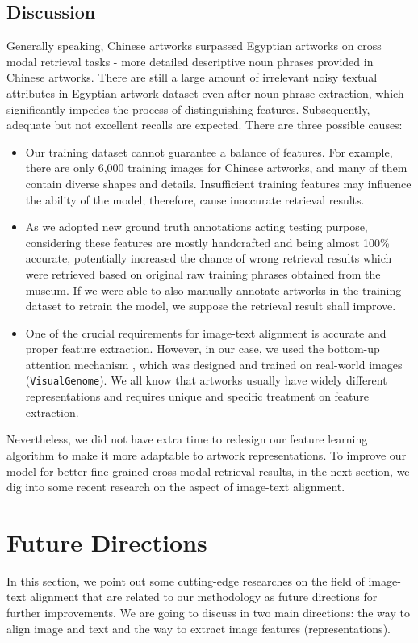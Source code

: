 \subsection{Discussion}
Generally speaking, Chinese artworks surpassed Egyptian artworks on cross modal retrieval tasks - more detailed descriptive noun phrases provided in Chinese artworks. There are still a large amount of irrelevant noisy textual attributes in Egyptian artwork dataset even after noun phrase extraction, which significantly impedes the process of distinguishing features. Subsequently, adequate but not excellent recalls are expected. There are three possible causes:

\begin{itemize}
    \item Our training dataset cannot guarantee a balance of features. For example, there are only 6,000 training images for Chinese artworks, and many of them contain diverse shapes and details. Insufficient training features may influence the ability of the model; therefore, cause inaccurate retrieval results.
    \item As we adopted new ground truth annotations acting testing purpose, considering these features are mostly handcrafted and being almost 100\% accurate, potentially increased the chance of wrong retrieval results which were retrieved based on original raw training phrases obtained from the museum. If we were able to also manually annotate artworks in the training dataset to retrain the model, we suppose the retrieval result shall improve.
    \item One of the crucial requirements for image-text alignment is accurate and proper feature extraction. However, in our case, we used the bottom-up attention mechanism \cite{bottomup}, which was designed and trained on real-world images (\verb|VisualGenome|). We all know that artworks usually have widely different representations and requires unique and specific treatment on feature extraction.
\end{itemize}

Nevertheless, we did not have extra time to redesign our feature learning algorithm to make it more adaptable to artwork representations. To improve our model for better fine-grained cross modal retrieval results, in the next section, we dig into some recent research on the aspect of image-text alignment. 

\section{Future Directions}
In this section, we point out some cutting-edge researches on the field of image-text alignment that are related to our methodology as future directions for further improvements. We are going to discuss in two main directions: the way to align image and text and the way to extract image features (representations).

